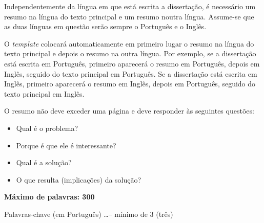 Independentemente da língua em que está escrita a dissertação, é necessário um resumo na língua do texto principal e um resumo noutra língua.  Assume-se que as duas línguas em questão serão sempre o Português e o Inglês.

O \emph{template} colocará automaticamente em primeiro lugar o resumo na língua do texto principal e depois o resumo na outra língua.  Por exemplo, se a dissertação está escrita em Português, primeiro aparecerá o resumo em Português, depois em Inglês, seguido do texto principal em Português. Se a dissertação está escrita em Inglês, primeiro aparecerá o resumo em Inglês, depois em Português, seguido do texto principal em Inglês.

O resumo não deve exceder uma página e deve responder às seguintes questões:
\begin{itemize}
	\item Qual é o problema?
	\item Porque é que ele é interessante?
	\item Qual é a solução?
	\item O que resulta (implicações) da solução?
\end{itemize}

\textbf{Máximo de palavras: 300}
\begin{keywords}
Palavras-chave (em Português) \ldots -- mínimo de 3 (três)
\end{keywords}

